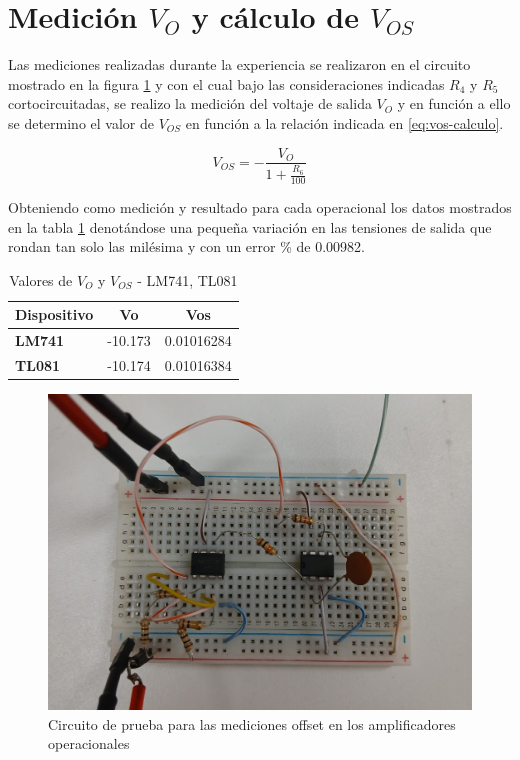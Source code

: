 \section{Medición $V_O$ y cálculo de $V_{OS}$ }

Las mediciones realizadas durante la experiencia se realizaron en el circuito mostrado en la figura \ref{fig:opam-offset} y con el cual bajo las consideraciones indicadas $R_4$ y $R_5$ cortocircuitadas, se realizo la medición del voltaje de salida $V_O$ y en función a ello se determino el valor de $V_{OS}$ en función a la relación indicada en \ref{eq:vos-calculo}.

\begin{equation}
	V_{OS} = -\frac{V_O}{1 + \frac{R_6}{100}}
	\label{eq:vos-calculo}
\end{equation}

Obteniendo como medición y resultado para cada operacional los datos mostrados en la tabla \ref{tab:mediciones-vo-vos} denotándose una pequeña variación en las tensiones de salida que rondan tan solo las milésima y con un error \% de 0.00982. 

\begin{table}[]
	\centering
	\begin{tabular}{|l|l|l|}
		\hline
		\multicolumn{1}{|c|}{\textbf{Dispositivo}} & \multicolumn{1}{c|}{\textbf{Vo}} & \multicolumn{1}{c|}{\textbf{Vos}} \\ \hline
		\textbf{LM741}                             & -10.173                          & 0.01016284                        \\ \hline
		\textbf{TL081}                             & -10.174                          & 0.01016384                        \\ \hline
	\end{tabular}
	\caption{Valores de $V_O$ y $V_{OS}$ - LM741, TL081}
	\label{tab:mediciones-vo-vos}
\end{table}

\begin{figure}[h]
	\centering
	\includegraphics[width=0.4\linewidth]{media/opam-offset}
	\caption{Circuito de prueba para las mediciones offset en los amplificadores operacionales}
	\label{fig:opam-offset}
\end{figure}

